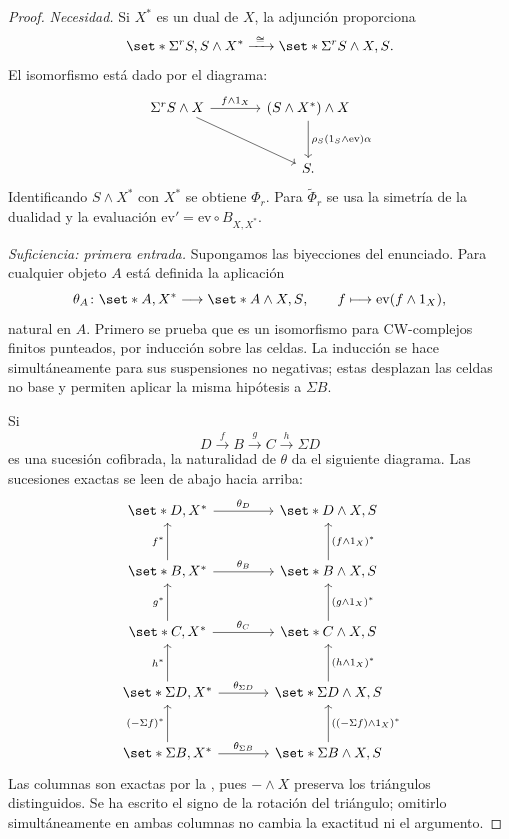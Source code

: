 \begin{proof}
\emph{Necesidad.} Si $X^*$ es un dual de $X$, la adjunción proporciona
\[
\set*{\Sigma^rS,S\wedge X^*}
\xrightarrow{\ \cong\ }
\set*{\Sigma^rS\wedge X,S}.
\]
El isomorfismo está dado por el diagrama:
\[
\begin{tikzcd}[column sep=large,row sep=large]
\Sigma^rS\wedge X \arrow[r,"{f\wedge1_X}"] \arrow[dr]
 &(S\wedge X^*)\wedge X
 \arrow[d,"{{\rho_S(1_S\wedge\mathrm{ev})\alpha}}"]\\
 &S .
\end{tikzcd}
\]
Identificando $S\wedge X^*$ con $X^*$ se obtiene $\Phi_r$.
Para $\widetilde\Phi_r$ se usa la simetría de la dualidad y la evaluación
$\mathrm{ev}'=\mathrm{ev}\circ B_{X,X^*}$.

\emph{Suficiencia: primera entrada.}
Supongamos las biyecciones del enunciado. Para cualquier objeto $A$ está definida la aplicación
\[
\theta_A\colon\set*{A,X^*}\longrightarrow\set*{A\wedge X,S},
\qquad
f\longmapsto\mathrm{ev}(f\wedge1_X),
\]
natural en $A$. Primero se prueba que es un isomorfismo para CW-complejos finitos punteados, por inducción sobre las celdas. La inducción se hace simultáneamente para sus suspensiones no negativas; estas desplazan las celdas no base y permiten aplicar la misma hipótesis a $\Sigma B$.

Si
\[
D\xrightarrow{f}B\xrightarrow{g}C\xrightarrow{h}\Sigma D
\]
es una sucesión cofibrada, la naturalidad de $\theta$ da el siguiente diagrama. Las sucesiones exactas se leen de abajo hacia arriba:
\[
\begin{tikzcd}[column sep=large,row sep=large]
\set*{D,X^*}\arrow[r,"{\theta_D}"]
 &\set*{D\wedge X,S}\\
\set*{B,X^*}\arrow[u,"{f^*}"]\arrow[r,"{\theta_B}"]
 &\set*{B\wedge X,S}\arrow[u,"{(f\wedge1_X)^*}"']\\
\set*{C,X^*}\arrow[u,"{g^*}"]\arrow[r,"{\theta_C}"]
 &\set*{C\wedge X,S}\arrow[u,"{(g\wedge1_X)^*}"']\\
\set*{\Sigma D,X^*}\arrow[u,"{h^*}"]\arrow[r,"{\theta_{\Sigma D}}"]
 &\set*{\Sigma D\wedge X,S}\arrow[u,"{(h\wedge1_X)^*}"']\\
\set*{\Sigma B,X^*}\arrow[u,"{(-\Sigma f)^*}"]\arrow[r,"{\theta_{\Sigma B}}"]
 &\set*{\Sigma B\wedge X,S}\arrow[u,"{((-\Sigma f)\wedge1_X)^*}"']
\end{tikzcd}
\]
Las columnas son exactas por la , pues $-\wedge X$ preserva los triángulos distinguidos. Se ha escrito el signo de la rotación del triángulo; omitirlo simultáneamente en ambas columnas no cambia la exactitud ni el argumento.


\end{proof}
